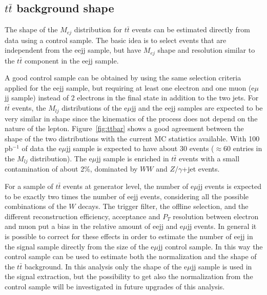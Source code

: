 \documentclass[colclass=cmspaper]{combine}
\begin{document}
\begin{linenumbers}


\subsection{$t\bar{t}$ background shape}

The shape of the $M_{ej}$ distribution for $t\bar{t}$ events can be estimated directly from data using a control sample. 
The basic idea is to select events that are independent from the eejj sample, but have $M_{ej}$ shape and resolution 
similar to the $t\bar{t}$ component in the eejj sample.

A good control sample can be obtained by using the same selection criteria applied for the eejj sample, but 
requiring at least one electron and one muon (e$\mu$jj sample) instead of 2 electrons 
in the final state in addition to the two jets. 
For $t\bar{t}$ events, the $M_{lj}$ distributions of the e$\mu$jj and the eejj samples
are expected to be very similar in shape since the kinematics of the process does not depend 
on the nature of the lepton. Figure~\ref{fig:ttbar} shows a good agreement between 
the shape of the two distributions with the current MC statistics available. 
With 100 pb$^{-1}$ of data the e$\mu$jj sample is expected to have about 30 events 
($\approx 60$ entries in the $M_{lj}$ distribution).
The e$\mu$jj sample is enriched in $t\bar{t}$ events with a small contamination of about 
2\%, dominated by $WW$ and $Z/\gamma$+jet events. 

For a sample of $t\bar{t}$ events at generator level, the number of e$\mu$jj events is expected to be exactly two times the number of 
eejj events, considering all the possible combinations of the $W$ decays. The trigger filter, the offline selection, 
and the different reconstruction efficiency, acceptance and $P_{T}$ resolution between electron and muon
put a bias in the relative amount of eejj and e$\mu$jj events.
In general it is possible to correct for these effects in order to estimate the number of eejj in the signal sample directly from 
the size of the e$\mu$jj control sample. In this way the control sample can be used to estimate both the normalization and the shape
of the $t\bar{t}$ background. In this analysis only the shape of the e$\mu$jj sample is used in the signal extraction, but
the possibility to get also the normalization from the control sample will be investigated in future upgrades of this analysis.


\end{linenumbers}
\end{document}
